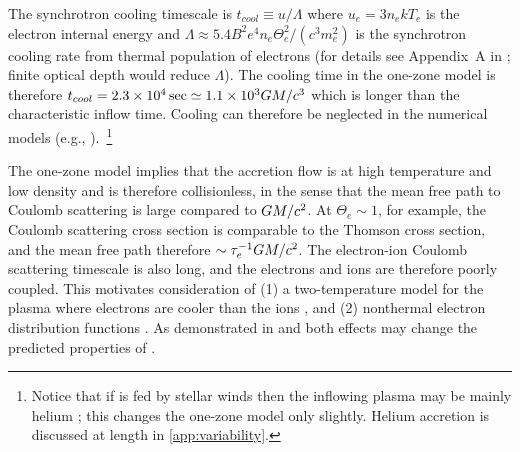 The synchrotron cooling timescale is $t_{cool} \equiv u/\Lambda$ where $u_e = 3 n_e k T_e$ is the electron internal energy and $\Lambda \approx 5.4 B^2 e^4 n_e \Theta_e^2 /(c^3 m_e^2)$ is the synchrotron cooling rate from thermal population of electrons (for details see Appendix~A in \citealt{2011ApJ...735....9M}; finite optical depth would reduce $\Lambda$). The cooling time in the one-zone model is therefore $t_{cool}=2.3 \times 10^4\sec \simeq 1.1 \times 10^3 GM/c^3$ which is longer than the characteristic inflow time. Cooling can therefore be neglected in the numerical models (e.g., \citealt{2012MNRAS.426.1928D}).~\footnote{Notice that if \sgra is fed by stellar winds then the inflowing plasma may be mainly helium \citep{2019MNRAS.482L.123R}; this changes the one-zone model only slightly.  Helium accretion is discussed at length in \ref{app:variability}.}

The one-zone model implies that the accretion flow is at high temperature and low density and is therefore collisionless, in the sense that the mean free path to Coulomb scattering is large compared to $GM/c^2$. At $\Theta_e \sim 1$, for example, the Coulomb scattering cross section is comparable to the Thomson cross section, and the mean free path therefore $\sim \tau_e^{-1} GM/c^2$.   The electron-ion Coulomb scattering timescale is also long, and the electrons and ions are therefore poorly coupled.  This motivates consideration of (1) a two-temperature model for the plasma where electrons are cooler than the ions \citep{1976ApJ...204..187S,1977ApJ...214..840I, 1982Natur.295...17R}, and (2) nonthermal electron distribution functions  .  As demonstrated in \citet{2014A&A...570A...7M}  and \citet{2000ApJ...541..234O} both effects may change the predicted properties of \sgra.

